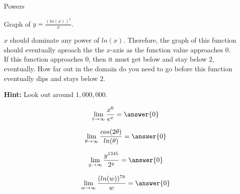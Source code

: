 \documentclass{ximera}
\begin{document}
\begin{example} Powers


Graph of $y = \frac{(ln(x))^5}{x}$.

$x$ should dominate any power of $ln(x)$.  Therefore, the graph of this function should eventually aproach the the $x$-axis as the function value approaches $0$. \\


If this function approaches $0$, then it must get below and stay below $2$, eventually. How far out in the domain do you need to go before this function eventually dips and stays below $2$.


\begin{center}
\end{center}




\textbf{Hint:} Look out around $1,000,000$.

\end{example}



\begin{question}

\[
\lim\limits_{t \to \infty} \frac{x^6}{e^x} = \answer{0}
\]

\end{question}









\begin{question}

\[
\lim\limits_{\theta \to \infty} \frac{cos(2 \theta)}{ln(\theta)} = \answer{0}
\]

\end{question}









\begin{question}

\[
\lim\limits_{y \to \infty} \frac{y^{1345}}{2^y} = \answer{0}
\]

\end{question}












\begin{question}

\[
\lim\limits_{w \to \infty} \frac{(ln(w))^{78}}{w} = \answer{0}
\]

\end{question}
\end{document}
